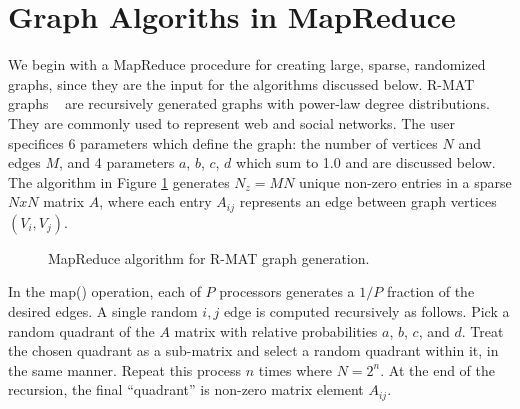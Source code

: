 \section{Graph Algoriths in MapReduce}
\label{sec:graph}

We begin with a MapReduce procedure for creating large, sparse,
randomized graphs, since they are the input for the algorithms
discussed below.  R-MAT graphs ~\cite{RMAT} are recursively generated
graphs with power-law degree distributions.  They are commonly used to
represent web and social networks.  The user specifices 6 parameters
which define the graph: the number of vertices $N$ and edges $M$, and
4 parameters $a$, $b$, $c$, $d$ which sum to 1.0 and are discussed
below.  The algorithm in Figure \ref{fig:rmat} generates $N_z = MN$
unique non-zero entries in a sparse $NxN$ matrix $A$, where each entry
$A_{ij}$ represents an edge between graph vertices $(V_i,V_j)$.

\begin{figure}[htb]
 \begin{center}\end{center}

 \caption{MapReduce algorithm for R-MAT graph generation.}

 \label{fig:rmat}
\end{figure}

In the map() operation, each of $P$ processors generates a $1/P$
fraction of the desired edges.  A single random $i,j$ edge is computed
recursively as follows.  Pick a random quadrant of the $A$ matrix with
relative probabilities $a$, $b$, $c$, and $d$.  Treat the chosen
quadrant as a sub-matrix and select a random quadrant within it, in
the same manner.  Repeat this process $n$ times where $N = 2^n$.  At
the end of the recursion, the final ``quadrant'' is non-zero matrix
element $A_{ij}$.

